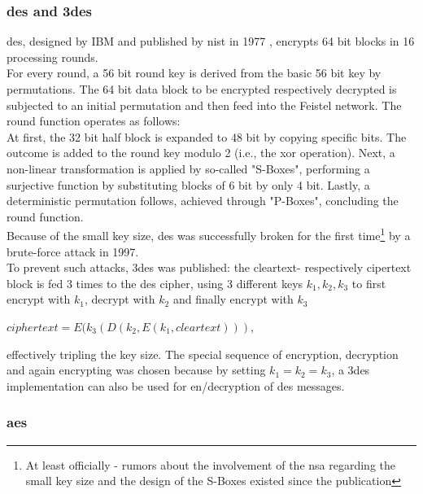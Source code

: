 \subsubsection{\gls{des} and \gls{3des}}
\gls{des}, designed by IBM and published by \gls{nist} in 1977 \cite{des}, encrypts 64 bit blocks in 16 processing rounds.
\\
For every round, a 56 bit round key is derived from the basic 56 bit
key by permutations. The 64 bit data block to be encrypted respectively decrypted is subjected to an initial permutation and then feed into the Feistel
network. The round function operates as follows:
\\
At first, the 32 bit half block is expanded to 48 bit by copying specific bits. The outcome is added to the round key modulo 2 (i.e., the \gls{xor} operation).
Next, a non-linear transformation is applied by so-called "S-Boxes", performing a surjective function by substituting blocks of 6 bit by only
4 bit. Lastly, a deterministic permutation follows, achieved through "P-Boxes", concluding the round
function.
\\
Because of the small key size, \gls{des} was successfully broken for the first time\footnote{At least officially - rumors about the involvement of the \gls{nsa}
regarding the small key size and the design of the S-Boxes existed since the publication} by a brute-force attack in 1997.
\\
To prevent such attacks, \gls{3des} was published: the cleartext- respectively 
cipertext block is fed 3 times to the \gls{des} cipher, using 3 different keys $k_1, k_2, k_3$ to first encrypt with $k_1$, decrypt with $k_2$ and finally 
encrypt with $k_3$
\begin{center}
 $ciphertext = E(k_3(D(k_2,E(k_1, cleartext)))$,
\end{center}
effectively tripling the key size.
The special sequence of encryption, decryption and again encrypting was chosen because by setting $k_1 = k_2 = k_3$, a \gls{3des} implementation can also be used
for en/decryption of \gls{des} messages.

\subsubsection{\gls{aes}}

